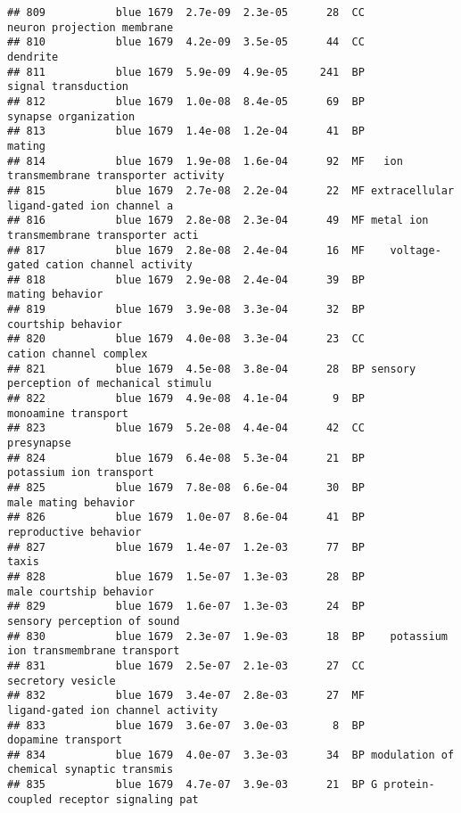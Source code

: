 \documentclass[]{article}
\begin{document}
\begin{verbatim}
## 809           blue 1679  2.7e-09  2.3e-05      28  CC               neuron projection membrane
## 810           blue 1679  4.2e-09  3.5e-05      44  CC                                 dendrite
## 811           blue 1679  5.9e-09  4.9e-05     241  BP                      signal transduction
## 812           blue 1679  1.0e-08  8.4e-05      69  BP                     synapse organization
## 813           blue 1679  1.4e-08  1.2e-04      41  BP                                   mating
## 814           blue 1679  1.9e-08  1.6e-04      92  MF   ion transmembrane transporter activity
## 815           blue 1679  2.7e-08  2.2e-04      22  MF extracellular ligand-gated ion channel a
## 816           blue 1679  2.8e-08  2.3e-04      49  MF metal ion transmembrane transporter acti
## 817           blue 1679  2.8e-08  2.4e-04      16  MF    voltage-gated cation channel activity
## 818           blue 1679  2.9e-08  2.4e-04      39  BP                          mating behavior
## 819           blue 1679  3.9e-08  3.3e-04      32  BP                       courtship behavior
## 820           blue 1679  4.0e-08  3.3e-04      23  CC                   cation channel complex
## 821           blue 1679  4.5e-08  3.8e-04      28  BP sensory perception of mechanical stimulu
## 822           blue 1679  4.9e-08  4.1e-04       9  BP                      monoamine transport
## 823           blue 1679  5.2e-08  4.4e-04      42  CC                               presynapse
## 824           blue 1679  6.4e-08  5.3e-04      21  BP                  potassium ion transport
## 825           blue 1679  7.8e-08  6.6e-04      30  BP                     male mating behavior
## 826           blue 1679  1.0e-07  8.6e-04      41  BP                    reproductive behavior
## 827           blue 1679  1.4e-07  1.2e-03      77  BP                                    taxis
## 828           blue 1679  1.5e-07  1.3e-03      28  BP                  male courtship behavior
## 829           blue 1679  1.6e-07  1.3e-03      24  BP              sensory perception of sound
## 830           blue 1679  2.3e-07  1.9e-03      18  BP    potassium ion transmembrane transport
## 831           blue 1679  2.5e-07  2.1e-03      27  CC                        secretory vesicle
## 832           blue 1679  3.4e-07  2.8e-03      27  MF        ligand-gated ion channel activity
## 833           blue 1679  3.6e-07  3.0e-03       8  BP                       dopamine transport
## 834           blue 1679  4.0e-07  3.3e-03      34  BP modulation of chemical synaptic transmis
## 835           blue 1679  4.7e-07  3.9e-03      21  BP G protein-coupled receptor signaling pat

\end{verbatim}
\end{document}
